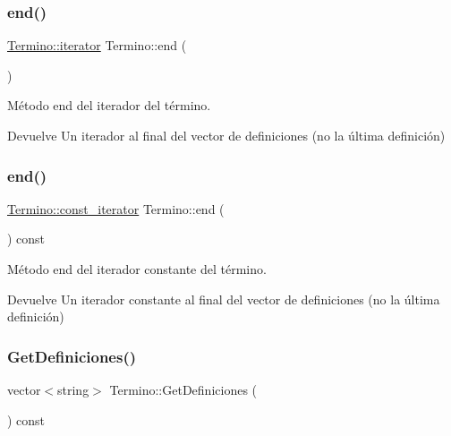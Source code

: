 \subsubsection{\texorpdfstring{end()}{end()}\hspace{0.1cm}{\footnotesize\ttfamily [1/2]}}
{\footnotesize\ttfamily \hyperlink{classTermino_a47bf17fd54656f315aa9257b4372e875}{Termino\+::iterator} Termino\+::end (\begin{DoxyParamCaption}{ }\end{DoxyParamCaption})}



Método end del iterador del término. 

\begin{DoxyReturn}{Devuelve}
Un iterador al final del vector de definiciones (no la última definición) 
\end{DoxyReturn}
\mbox{\label{classTermino_af14f79a17426160db9db162737e18b96}} 
\subsubsection{\texorpdfstring{end()}{end()}\hspace{0.1cm}{\footnotesize\ttfamily [2/2]}}
{\footnotesize\ttfamily \hyperlink{classTermino_a0c8a38779eb1a65b8fe9422b430895c9}{Termino\+::const\+\_\+iterator} Termino\+::end (\begin{DoxyParamCaption}{ }\end{DoxyParamCaption}) const}



Método end del iterador constante del término. 

\begin{DoxyReturn}{Devuelve}
Un iterador constante al final del vector de definiciones (no la última definición) 
\end{DoxyReturn}
\mbox{\label{classTermino_a11d0d5aa55842b440263fc2e0d24941f}} 
\subsubsection{\texorpdfstring{Get\+Definiciones()}{GetDefiniciones()}}
{\footnotesize\ttfamily vector$<$string$>$ Termino\+::\+Get\+Definiciones (\begin{DoxyParamCaption}{ }\end{DoxyParamCaption}) const}



